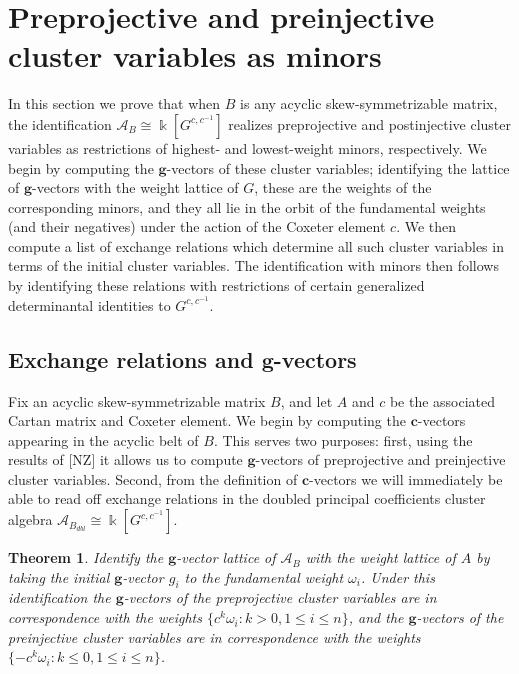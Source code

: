 \documentclass[12pt]{amsart}
\newcommand{\cA}{\mathcal{A}}
\newcommand{\kk}{\Bbbk}%
\newcommand{\bfc}{\mathbf{c}}
\newcommand{\bfg}{\mathbf{g}}
\newtheorem{theorem}{Theorem}[section]
\theoremstyle{remark}
\numberwithin{equation}{section}
\begin{document}
\section{Preprojective and preinjective cluster variables as minors}
In this section we prove that when $B$ is any acyclic skew-symmetrizable matrix, the identification $\cA_B \cong \kk[G^{c,c^{-1}}]$ realizes preprojective and postinjective cluster variables as restrictions of highest- and lowest-weight minors, respectively. We begin by computing the $\bfg$-vectors of these cluster variables; identifying the lattice of $\bfg$-vectors with the weight lattice of $G$, these are the weights of the corresponding minors, and they all lie in the orbit of the fundamental weights (and their negatives) under the action of the Coxeter element $c$. We then compute a list of exchange relations which determine all such cluster variables in terms of the initial cluster variables. The identification with minors then follows by identifying these relations with restrictions of certain generalized determinantal identities to $G^{c,c^{-1}}$.

\subsection{Exchange relations and $\bfg$-vectors}\label{sec:exchange}

Fix an acyclic skew-symmetrizable matrix $B$, and let $A$ and $c$ be the associated Cartan matrix and Coxeter element. We begin by computing the $\bfc$-vectors appearing in the acyclic belt of $B$. This serves two purposes: first, using the results of [NZ] it allows us to compute $\bfg$-vectors of preprojective and preinjective cluster variables. Second, from the definition of $\bfc$-vectors we will immediately be able to read off exchange relations in the doubled principal coefficients cluster algebra $\cA_{B_{dbl}} \cong \kk[G^{c,c^{-1}}]$.

\begin{theorem}
Identify the $\bfg$-vector lattice of $\cA_B$ with the weight lattice of $A$ by taking the initial $\bfg$-vector $g_i$ to the fundamental weight $\omega_i$. Under this identification the $\bfg$-vectors of the preprojective cluster variables are in correspondence with the weights $\{c^k\omega_i : k > 0, 1 \leq i \leq n\}$, and the $\bfg$-vectors of the preinjective cluster variables are in correspondence with the weights $\{-c^k\omega_i : k \leq 0, 1 \leq i \leq n\}$.
\end{theorem}
\end{document}
